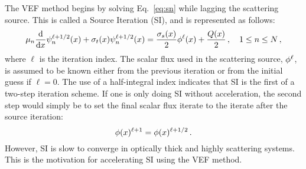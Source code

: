 The VEF method begins by solving Eq.~\ref{eq:sn} while lagging the scattering source.  This is called a Source Iteration (SI), 
and is represented as follows:
	\begin{equation} \label{eq:si}
		\mu_n \frac{\mathop{}\!\mathrm{d} }{\mathop{}\!\mathrm{d} x}\psi_n^{\ell+1/2}(x) + \sigma_t(x) \psi_n^{\ell+1/2}(x) = 
		\frac{\sigma_s(x)}{2} \phi^\ell(x) + \frac{Q(x)}{2} \,, \quad 1 \leq n \leq N \,,
	\end{equation}
where $\ell$ is the iteration index.  The scalar flux used in the scattering source, $\phi^\ell$, is assumed to be known either from the previous iteration or from the initial guess if $\ell=0$.  The use of a half-integral index indicates that SI is the first of a two-step iteration scheme.  If one is only doing SI without acceleration, the second step would simply be to set the final scalar flux iterate to the iterate after the source iteration: 
	\begin{equation} \label{eq:siupdate}
		\phi(x)^{\ell+1} = \phi(x)^{\ell+1/2} \,.
	\end{equation}
However, SI is slow to converge in optically thick and highly scattering systems. This is the motivation for accelerating 
SI using the VEF method.  

